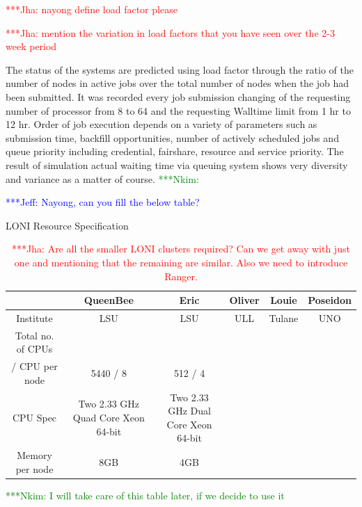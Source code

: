 \documentclass[conference,final]{IEEEtran}
\newcommand{\jhanote}[1]{ {\textcolor{red} { ***Jha: #1 }}}
\newcommand{\Nkimnote}[1]{ {\textcolor{green} { ***Nkim: #1 }}}
\newcommand{\skonote}[1]{ {\textcolor{blue} { ***Jeff: #1 }}}
\newcommand{\jhanote}[1]{}
\newcommand{\Nkimnote}[1]{}
\newcommand{\skonote}[1]{}
\begin{document}
\jhanote{nayong define load factor please}

\jhanote{mention the variation in load factors that you have seen over
  the 2-3 week period}
  

The status of the systems are predicted using load factor through the ratio of the number of nodes in active jobs over the total number of nodes when the job had been submitted. It was recorded every job submission changing of the requesting number of processor from 8 to 64 and the requesting Walltime limit from 1 hr to 12 hr. Order of job execution depends on a variety of parameters such as submission time, backfill opportunities, number of actively scheduled jobs and queue priority including credential, fairshare, resource and service priority. The result of simulation actual waiting time via queuing system shows very diversity and variance as a matter of course. 
\Nkimnote{}


\skonote{Nayong, can you fill the below table?}

\setlength{\tabcolsep}{1pt}
\begin{table}[!ht]
\begin{center}

\caption{\small LONI Resource Specification}
\label{table:LONI_resource}

\begin{tabular}{ c || c | c | c | c | c}

\hline
 & QueenBee & Eric & Oliver & Louie & Poseidon \\
\hline
\hline
Institute &LSU  &LSU  & ULL &  Tulane& UNO\\
\hline
Total no. of CPUs &  &  \\
/ CPU per node & 5440 / 8 & 512 / 4  \\
\hline
CPU Spec & 
Two 2.33 GHz Quad Core Xeon 64-bit & Two 2.33 GHz Dual Core Xeon 64-bit  \\
\hline
Memory per node & 8GB & 4GB \\
\hline

\end{tabular}
\caption{\jhanote{Are all the smaller LONI clusters required? Can we
    get away with just one and mentioning that the remaining are
    similar. Also we need to introduce Ranger.}}
\end{center}
\end{table}
\Nkimnote{I will take care of this table later, if we decide to use it}
\end{document}
